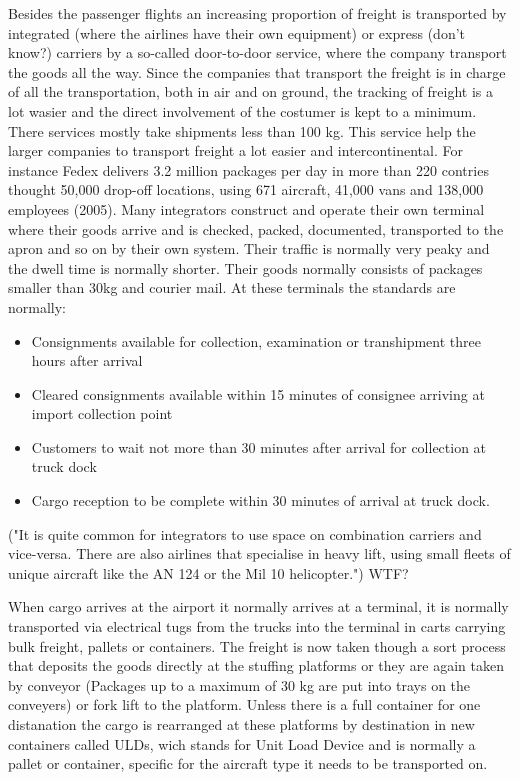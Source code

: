 Besides the passenger flights an increasing proportion of freight is transported by integrated (where the airlines have their own equipment) or express (don't know?) carriers by a so-called door-to-door service, where the company transport the goods all the way. Since the companies that transport the freight is in charge of all the transportation, both in air and on ground, the tracking of freight is a lot wasier and the direct involvement of the costumer is kept to a minimum. There services mostly take shipments less than 100 kg. This service help the larger companies to transport freight a lot easier and intercontinental. For instance Fedex delivers 3.2 million packages per day in more than 220 contries thought 50,000 drop-off locations, using 671 aircraft, 41,000 vans and 138,000 employees (2005).
Many integrators construct and operate their own terminal where their goods arrive and is checked, packed, documented, transported to the apron and so on by their own system. Their traffic is normally very peaky and the dwell time is normally shorter. Their goods normally consists of packages smaller than 30kg and courier mail. At these terminals the standards are normally:
\begin{itemize}
\item Consignments available for collection, examination or transhipment three hours after arrival
\item Cleared consignments available within 15 minutes of consignee arriving at import collection point
\item Customers to wait not more than 30 minutes after arrival for collection at truck dock
\item Cargo reception to be complete within 30 minutes of arrival at truck dock.
\end{itemize}

("It is quite common for integrators to use space on combination carriers and vice-versa. There are also airlines that specialise in heavy lift, using small fleets of unique aircraft like the AN 124 or the Mil 10 helicopter.") WTF?


When cargo arrives at the airport it normally arrives at a terminal, it is normally transported via electrical tugs from the trucks into the terminal in carts carrying bulk freight, pallets or containers. The freight is now taken though a sort process that deposits the goods directly at the stuffing platforms or they are again taken by conveyor (Packages up to a maximum of 30 kg are put into trays on the conveyers) or fork lift to the platform.
Unless there is a full container for one distanation the cargo is rearranged at these platforms by destination in new containers called ULDs, wich stands for Unit Load Device and is normally a pallet or container, specific for the aircraft type it needs to be transported on.


